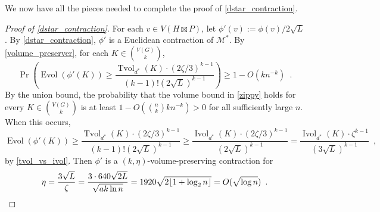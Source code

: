 \documentclass{patmorin}
\renewcommand{\ge}{\geqslant}
\renewcommand{\le}{\leqslant}
\newcommand{\david}[1]{{\color{orange} David: #1}}
\DeclareMathOperator{\bw}{bw}
\DeclareMathOperator{\evol}{Evol}
\DeclareMathOperator{\ivol}{Ivol}
\DeclareMathOperator{\tvol}{Tvol}
\begin{document}
We now have all the pieces needed to complete the proof of \cref{dstar_contraction}.

\begin{proof}[Proof of \cref{dstar_contraction}]
  For each $v\in V(H\boxtimes P)$, let $\phi'(v):=\phi(v)/2\sqrt{L}$. By \cref{dstar_contraction}, $\phi'$ is a Euclidean contraction of $\mathcal{M}^*$.  By \cref{volume_preserver}, for each $K\in \binom{V(G)}{k}$,
  \begin{equation}
    \Pr\left(\evol(\phi'(K)) \ge \frac{\tvol_{d^*}(K)\cdot(2\zeta/3)^{k-1}}{(k-1)!(2\sqrt{L})^{k-1}}\right) \ge 1- O(kn^{-k}) \enspace .
    \label{zippy}
  \end{equation}
  By the union bound, the probability that the volume bound in \cref{zippy} holds for every $K\in\binom{V(G)}{k}$ is at least $1-O(\binom{n}{k}kn^{-k}) > 0$ for all sufficiently large $n$.  When this occurs,
  \[
    \evol(\phi'(K)) \ge \frac{\tvol_{d^*}(K)\cdot(2\zeta/3)^{k-1}}{(k-1)!(2\sqrt{L})^{k-1}} \ge
    \frac{\ivol_{d^*}(K)\cdot(2\zeta/3)^{k-1}}{(2\sqrt{L})^{k-1}}
    =
    \frac{\ivol_{d^*}(K)\cdot\zeta^{k-1}}{(3\sqrt{L})^{k-1}}
    \enspace ,
  \]
  by \cref{tvol_vs_ivol}.  Then $\phi'$ is a $(k,\eta)$-volume-preserving contraction for
  \[
    \eta = \frac{3\sqrt{L}}{\zeta} = \frac{3\cdot 640\sqrt{2L}}{\sqrt{ak\ln n}} = {1920\sqrt{2{\lfloor 1+\log_2 n \rfloor}}} = O(\sqrt{\log n}) \enspace . \qedhere
  \]
\end{proof}


\end{document}
